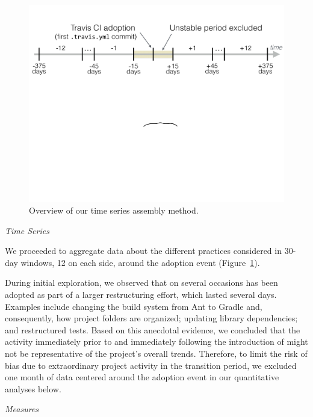 \begin{figure}[t]
	\centering
	\includegraphics[width=\columnwidth, clip=true, trim=0 392 0 40]{figures/timeline.pdf}
	\caption{Overview of our time series assembly method.}%
	\label{fig:timeseries}
\end{figure}

\smallskip\noindent\emph{Time Series}

We proceeded to aggregate data about the different practices considered
in 30-day windows, 12 on each side, around the \Tvis adoption event
(Figure~\ref{fig:timeseries}).

During initial exploration, we observed that on several occasions \Tvi has 
been adopted as part of a larger restructuring effort, which lasted several days.
Examples include changing the build system from Ant to Gradle and, 
consequently, how project folders are organized; updating library 
dependencies; and restructured tests.
Based on this anecdotal evidence, we concluded that the activity immediately 
prior to and immediately following the introduction of \Tvis might not be 
representative of the project's overall trends.
Therefore, to limit the risk of bias due to extraordinary project activity in 
the transition period, we excluded one month of data centered around the 
adoption event in our quantitative analyses below.

\smallskip\noindent\emph{Measures}

